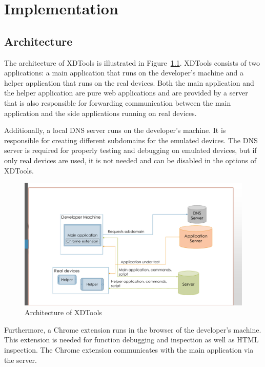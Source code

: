 \chapter{Implementation}

\section{Architecture}

The architecture of XDTools is illustrated in Figure~\ref{fig:architecture}. XDTools consists of two applications: a main application that runs on the developer's machine and a helper application that runs on the real devices. Both the main application and the helper application are pure web applications and are provided by a server that is also responsible for forwarding communication between the main application and the side applications running on real devices.

Additionally, a local DNS server runs on the developer's machine. It is responsible for creating different subdomains for the emulated devices. The DNS server is required for properly testing and debugging on emulated devices, but if only real devices are used, it is not needed and can be disabled in the options of XDTools.

\begin{figure}[H]
  \centering
    \includegraphics[width=1.0\textwidth]{images/architecture_2.pdf}
	\caption[Architecture of XDTools]{Architecture of XDTools}
	\label{fig:architecture}
\end{figure}

Furthermore, a Chrome extension runs in the browser of the developer's machine. This extension is needed for function debugging and inspection as well as HTML inspection. The Chrome extension communicates with the main application via the server.

